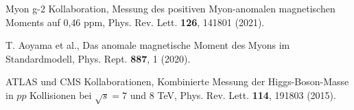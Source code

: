 \documentclass[12pt,a4paper]{article}
\begin{document}
	\begin{thebibliography}{99}
		
		Myon g-2 Kollaboration, Messung des positiven Myon-anomalen magnetischen Moments auf 0{,}46 ppm, Phys. Rev. Lett. \textbf{126}, 141801 (2021).
		
		T. Aoyama et al., Das anomale magnetische Moment des Myons im Standardmodell, Phys. Rept. \textbf{887}, 1 (2020).
		
		ATLAS und CMS Kollaborationen, Kombinierte Messung der Higgs-Boson-Masse in $pp$ Kollisionen bei $\sqrt{s} = 7$ und 8 TeV, Phys. Rev. Lett. \textbf{114}, 191803 (2015).
		
	\end{thebibliography}
	
\end{document}
